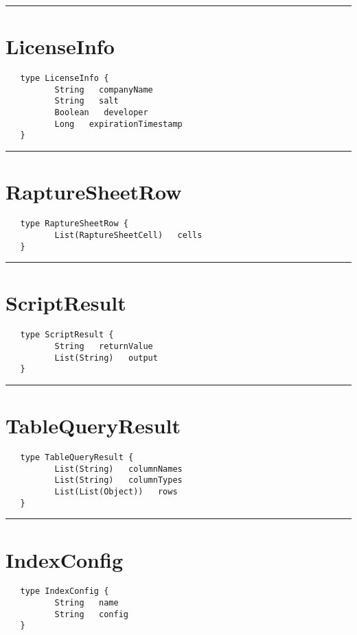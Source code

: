 \rule{15cm}{2pt}
\section{LicenseInfo}
\label{type:LicenseInfo}

\begin{verbatim}
   type LicenseInfo {
          String   companyName
          String   salt
          Boolean   developer
          Long   expirationTimestamp
   }
\end{verbatim}

\rule{15cm}{2pt}
\section{RaptureSheetRow}
\label{type:RaptureSheetRow}

\begin{verbatim}
   type RaptureSheetRow {
          List(RaptureSheetCell)   cells
   }
\end{verbatim}

\rule{15cm}{2pt}
\section{ScriptResult}
\label{type:ScriptResult}

\begin{verbatim}
   type ScriptResult {
          String   returnValue
          List(String)   output
   }
\end{verbatim}

\rule{15cm}{2pt}
\section{TableQueryResult}
\label{type:TableQueryResult}

\begin{verbatim}
   type TableQueryResult {
          List(String)   columnNames
          List(String)   columnTypes
          List(List(Object))   rows
   }
\end{verbatim}

\rule{15cm}{2pt}
\section{IndexConfig}
\label{type:IndexConfig}

\begin{verbatim}
   type IndexConfig {
          String   name
          String   config
   }
\end{verbatim}


